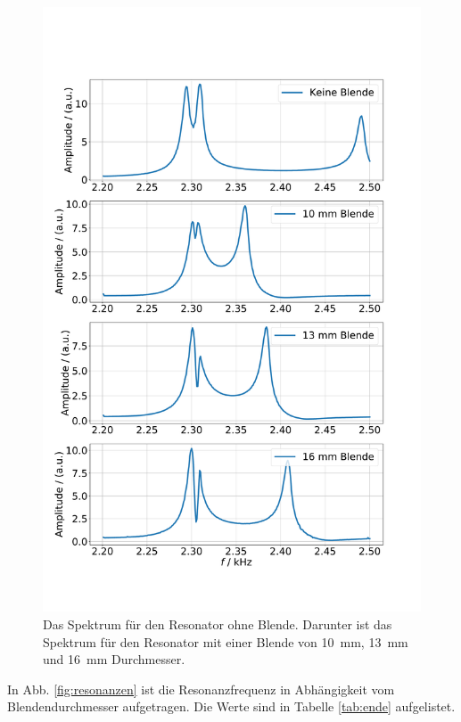 \begin{figure}
    \centering
    \includegraphics[height=0.7\textheight]{plots/D_1.pdf}
    \caption{Das Spektrum für den Resonator ohne Blende. Darunter ist das Spektrum für den Resonator mit einer Blende von \SI{10}{\milli\metre}, \SI{13}{\milli\metre} und \SI{16}{\milli\metre} Durchmesser.}
    \label{fig:molek1}
\end{figure}

In Abb. \ref{fig:resonanzen} ist die Resonanzfrequenz in Abhängigkeit vom Blendendurchmesser aufgetragen. Die Werte sind in Tabelle \ref{tab:ende} aufgelistet.

